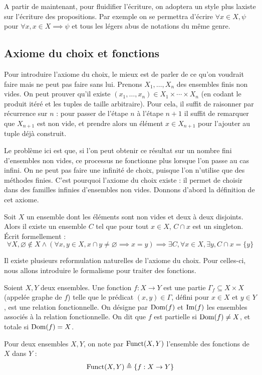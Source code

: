 \begin{notation}
  A partir de maintenant, pour fluidifier l'écriture, on adoptera un style plus
  laxiste sur l'écriture des propositions. Par exemple on se permettra d'écrire
  $\forall x \in X, \psi$ pour $\forall x, x\in X \implies \psi$ et tous les
  légers abus de notations du même genre.
\end{notation}

\subsection{Axiome du choix et fonctions}

Pour introduire l'axiome du choix, le mieux est de parler de ce qu'on voudrait
faire mais ne peut pas faire sans lui. Prenons $X_1,\ldots,X_n$ des ensembles
finis non vides. On peut prouver qu'il existe
$(x_1,\ldots,x_n)\in X_1\times\cdots\times X_n$ (en codant le produit itéré et
les tuples de taille arbitraire). Pour cela, il suffit de raisonner par
récurrence sur $n$ : pour passer de l'étape $n$ à l'étape $n+1$ il suffit de
remarquer que $X_{n+1}$ est non vide, et prendre alors un élément $x\in X_{n+1}$
pour l'ajouter au tuple déjà construit.

Le problème ici est que, si l'on peut obtenir ce résultat sur un nombre fini
d'ensembles non vides, ce processus ne fonctionne plus lorsque l'on passe au cas
infini. On ne peut pas faire une infinité de choix, puisque l'on n'utilise que
des méthodes finies. C'est pourquoi l'axiome du choix existe : il permet de
choisir dans des familles infinies d'ensembles non vides. Donnons d'abord la
définition de cet axiome.

\begin{axiom}[Choix]
  Soit $X$ un ensemble dont les éléments sont non vides et deux à deux disjoints.
  Alors il existe un ensemble $C$ tel que pour tout $x\in X$, $C\cap x$ est un
  singleton. \'Ecrit formellement :
  \[
  \forall X, \varnothing\notin X \land (\forall x,y \in X, x \cap y \neq
  \varnothing \implies x = y)
  \implies \exists C, \forall x \in X, \exists y, C \cap x = \{y\}
  \]
\end{axiom}

Il existe plusieurs reformulation naturelles de l'axiome du choix. Pour
celles-ci, nous allons introduire le formalisme pour traiter des fonctions.

\begin{definition}[Fonction]
  Soient $X,Y$ deux ensembles. Une fonction $f : X \to Y$ est une partie
  $\Gamma_f\subseteq X \times X$ (appelée graphe de $f$)  telle que le prédicat
  $(x,y)\in \Gamma$, défini pour $x\in X$ et $y\in Y$, est une relation
  fonctionnelle. On désigne par $\operatorname{Dom}(f)$ et $\operatorname{Im}(f)$ les ensembles associés à la
  relation fonctionnelle. On dit que $f$ est partielle si $\operatorname{Dom}(f) \neq X$, et
  totale si $\operatorname{Dom}(f) = X$.

  Pour deux ensembles $X,Y$, on note par $\operatorname{Funct}(X,Y)$ l'ensemble des fonctions
  de $X$ dans $Y$ :
  \[\operatorname{Funct}(X,Y) \triangleq \{f : X \to Y\}\]
\end{definition}

